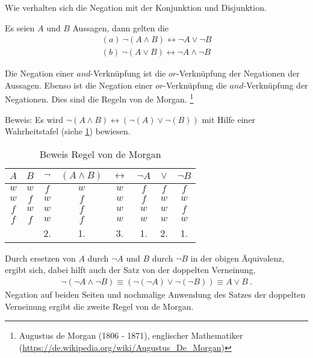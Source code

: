 \begin{Unit}
Wie verhalten sich die Negation mit der Konjunktion und Disjunktion. 

\begin{Satz}
Es seien $A$ und $B$ Aussagen, dann gelten die 
\begin{align}
  (a)\ \neg (A \land B) \leftrightarrow \neg A \lor \neg B \\
  (b)\ \neg (A \lor B) \leftrightarrow \neg A \land \neg B
\end{align}
\end{Satz}

Die Negation einer $and$-Verknüpfung ist die $or$-Verknüpfung der Negationen 
der Aussagen. Ebenso ist die Negation einer $or$-Verknüpfung die 
$and$-Verknüpfung der Negationen. Dies sind die Regeln von de 
Morgan.
\footnote{Augustus de Morgan (1806 - 1871), englischer Mathematiker
(\url{https://de.wikipedia.org/wiki/Augustus_De_Morgan})}

Beweis: Es wird $\neg(A \land B) \leftrightarrow (\neg(A) \lor \neg(B))$
mit Hilfe einer Wahrheitstafel (siehe 
\ref{tbl:Beweis Regel von de Morgan}) bewiesen.

\begin{table}[htbp]
\begin{center}
\begin{tabular}{c|c||c|c|c|c|c|c}
  $A$ &   $B$ & $\neg$ & $(A \land B)$ & $\leftrightarrow $ & $\neg A$ & 
    $\lor$ & $\neg B$ \\ 
    \hline
  $w$ &   $w$ & $f$   &   $w$  & $w$  &   $f$  & $f$  &   $f$  \\
  $w$ &   $f$ & $w$   &   $f$  & $w$  &   $f$  & $w$  &   $w$  \\
  $f$ &   $w$ & $w$   &   $f$  & $w$  &   $w$  & $w$  &   $f$  \\
  $f$ &   $f$ & $w$   &   $f$  & $w$  &   $w$  & $w$  &   $w$  \\  \hline
    &   &   2.  & 1. & 3. & 1. & 2. & 1. \\
\end{tabular}
\caption{Beweis Regel von de Morgan}
\label{tbl:Beweis Regel von de Morgan}
\end{center}
\end{table}

Durch ersetzen von $A$ durch $\neg A$ und $B$ durch $\neg B$ in der obigen
Äquivalenz, ergibt sich, dabei hilft auch der Satz von der doppelten 
Verneinung,
\begin{align}
  \neg(\neg A \land \neg B) \equiv (\neg(\neg A) \lor \neg(\neg B)) 
  \equiv A \lor B \ .
\end{align}
Negation auf beiden Seiten und nochmalige Anwendung des Satzes der 
doppelten Verneinung ergibt die zweite Regel von de Morgan. 


\end{Unit}
